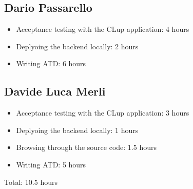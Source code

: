 \subsection{Dario Passarello}
\begin{itemize}
    \item Acceptance testing with the CLup application: 4 hours
    \item Deplyoing the backend locally: 2 hours
    \item Writing ATD: 6 hours
\end{itemize}

\subsection{Davide Luca Merli}
\begin{itemize}
    \item Acceptance testing with the CLup application: 3 hours
    \item Deplyoing the backend locally: 1 hours
    \item Browsing through the source code: 1.5 hours
    \item Writing ATD: 5 hours
\end{itemize}
Total: 10.5 hours